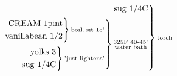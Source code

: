 \documentclass[12pt]{standalone}
\begin{document}
\[
\begin{rcases}\begin{alignedat}{3}
\text{sug 1/4C}\\
\begin{rcases}\begin{alignedat}{3}
\begin{rcases}\begin{alignedat}{3}
\text{CREAM 1pint}\\
\text{vanillabean 1/2}\\
\end{alignedat}\end{rcases}
\substack{\text{boil, sit 15'}}\\
\begin{rcases}\begin{alignedat}{3}
\text{yolks 3}\\
\text{sug 1/4C}\\
\end{alignedat}\end{rcases}
\substack{\text{'just lightens'}}\\
\end{alignedat}\end{rcases}
\substack{\text{325F 40-45'}\\\text{water bath}}\\
\end{alignedat}\end{rcases}
\substack{\text{torch}}\\
\]
\end{document}

